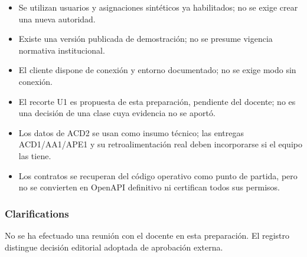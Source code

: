 \documentclass[11pt,a4paper]{article}
\providecommand{\tightlist}{\setlength{\itemsep}{0pt}\setlength{\parskip}{0pt}}
\begin{document}
\begin{itemize}
\tightlist
\item
  Se utilizan usuarios y asignaciones sintéticos ya habilitados; no se
  exige crear una nueva autoridad.
\item
  Existe una versión publicada de demostración; no se presume vigencia
  normativa institucional.
\item
  El cliente dispone de conexión y entorno documentado; no se exige modo
  sin conexión.
\item
  El recorte U1 es propuesta de esta preparación, pendiente del docente;
  no es una decisión de una clase cuya evidencia no se aportó.
\item
  Los datos de ACD2 se usan como insumo técnico; las entregas
  ACD1/AA1/APE1 y su retroalimentación real deben incorporarse si el
  equipo las tiene.
\item
  Los contratos se recuperan del código operativo como punto de partida,
  pero no se convierten en OpenAPI definitivo ni certifican todos sus
  permisos.
\end{itemize}

\subsubsection{Clarifications}\label{clarifications}

No se ha efectuado una reunión con el docente en esta preparación. El
registro distingue decisión editorial adoptada de aprobación externa.
\end{document}
